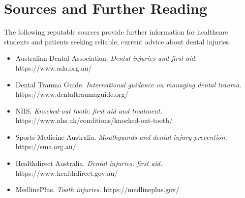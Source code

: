 \section*{Sources and Further Reading}
The following reputable sources provide further information for healthcare students and patients seeking reliable, current advice about dental injuries.

\begin{itemize}
    \item Australian Dental Association. \textit{Dental injuries and first aid.} https://www.ada.org.au/
    \item Dental Trauma Guide. \textit{International guidance on managing dental trauma.} https://www.dentaltraumaguide.org/
    \item NHS. \textit{Knocked-out tooth: first aid and treatment.} https://www.nhs.uk/conditions/knocked-out-tooth/
    \item Sports Medicine Australia. \textit{Mouthguards and dental injury prevention.} https://sma.org.au/
    \item Healthdirect Australia. \textit{Dental injuries: first aid.} https://www.healthdirect.gov.au/
    \item MedlinePlus. \textit{Tooth injuries.} https://medlineplus.gov/
\end{itemize}
